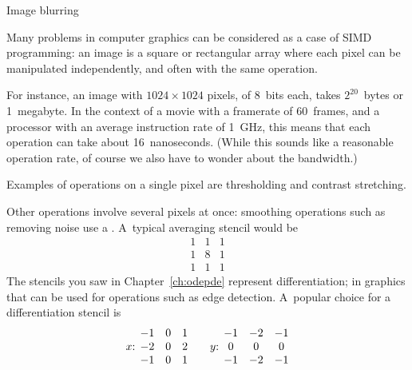 

 {Image blurring}

Many problems in computer graphics can be
considered as a case of \ac{SIMD} programming:
an image is a square or rectangular array
where each pixel can be manipulated independently,
and often with the same operation.

For instance, an image with $1024\times 1024$
pixels, of 8~bits each, takes $2^{20}$~bytes or 1~megabyte.
In the context of a movie with a framerate of 60~frames,
and a processor with an average instruction rate
of 1~GHz, this means that each operation can take about 16~nanoseconds.
%
(While this sounds like a reasonable operation rate,
of course we also have to wonder about the bandwidth.)

Examples of operations on a single pixel are
thresholding and contrast stretching.

Other operations involve several pixels at once:
smoothing operations such as removing noise
use a .
A~typical averaging stencil would be 
\[
\begin{matrix}
  1&1&1\\ 1&8&1\\ 1&1&1
\end{matrix}
\]
The stencils you saw in Chapter~\ref{ch:odepde} represent
differentiation; in graphics that can be used for operations
such as edge detection. A~popular choice for a differentiation stencil is
\[
\hbox{$x$: }
\begin{matrix}
  -1&0&1\\ -2&0&2\\ -1&0&1
\end{matrix}
\qquad\hbox{$y$: }
\begin{matrix}
  -1&-2&-1\\ 0&0&0\\ -1&-2&-1
\end{matrix}
\]


